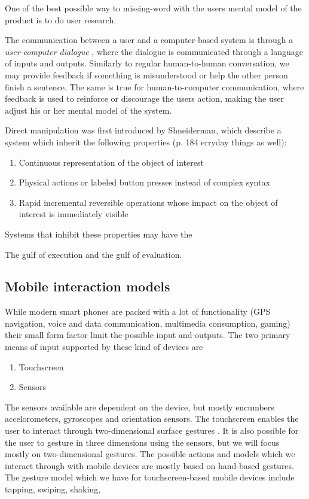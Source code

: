 One of the best possible way to missing-word with the users mental model of the product is to do user research.

The communication between a user and a computer-based system is through a \textit{user-computer dialogue} \cite{Foley1996}, where the dialogue is communicated through a language of inputs and outputs. Similarly to regular human-to-human conversation, we may provide feedback if something is misunderstood or help the other person finish a sentence. The same is true for human-to-computer communication, where feedback is used to reinforce or discourage the users action, making the user adjust his or her mental model of the system.

Direct manipulation was first introduced by Shneiderman, which describe a system which inherit the following properties (p. 184 erryday things as well):

\begin{enumerate}
  \item Continuous representation of the object of interest
  \item Physical actions or labeled button presses instead of complex syntax
  \item Rapid incremental reversible operations whose impact on the object of interest is immediately visible
\end{enumerate}

Systems that inhibit these properties may have the

The gulf of execution and the gulf of evaluation.

\subsection{Mobile interaction models} %
While modern smart phones are packed with a lot of functionality (GPS navigation, voice and data communication, multimedia consumption, gaming) their small form factor limit the possible input and outputs. The two primary means of input supported by these kind of devices are
\begin{enumerate}
  \item Touchscreen
  \item Sensors
\end{enumerate}
The sensors available are dependent on the device, but mostly encumbers accelorometers, gyroscopes and orientation sensors. The touchscreen enables the user to interact through two-dimensional surface gestures \cite{Ruiz2011}. It is also possible for the user to gesture in three dimensions using the sensors, but we will focus mostly on two-dimensional gestures.
The possible actions and models which we interact through with mobile devices are mostly based on hand-based gestures. The gesture model which we have for touchscreen-based mobile devices include tapping, swiping, shaking,


